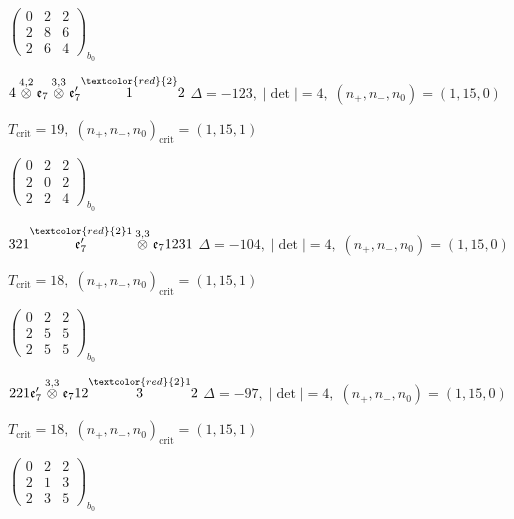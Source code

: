 \documentclass[10pt]{article}
\begin{document}
\hspace{2em}$\left(\begin{smallmatrix}0 & 2 & 2 \\ 2 & 8 & 6 \\ 2 & 6 & 4\end{smallmatrix}\right)_{\!b_0}$

\smallskip

$4\overset{4,2}{\otimes}\mathfrak{e}_7\overset{3,3}{\otimes}\mathfrak{e}_7'\overset{\textcolor{red}{2}}{1}2$ \quad $\Delta=-123,\; |\det|=4,\; (n_+,n_-,n_0)=(1,15,0)$

\hspace{1em}$T_{\text{crit}}=19,\; (n_+,n_-,n_0)_{\text{crit}}=(1,15,1)$

\hspace{2em}$\left(\begin{smallmatrix}0 & 2 & 2 \\ 2 & 0 & 2 \\ 2 & 2 & 4\end{smallmatrix}\right)_{\!b_0}$

\smallskip

$321\overset{\textcolor{red}{2}1}{\mathfrak{e}_7'}\overset{3,3}{\otimes}\mathfrak{e}_71231$ \quad $\Delta=-104,\; |\det|=4,\; (n_+,n_-,n_0)=(1,15,0)$

\hspace{1em}$T_{\text{crit}}=18,\; (n_+,n_-,n_0)_{\text{crit}}=(1,15,1)$

\hspace{2em}$\left(\begin{smallmatrix}0 & 2 & 2 \\ 2 & 5 & 5 \\ 2 & 5 & 5\end{smallmatrix}\right)_{\!b_0}$

\smallskip

$221\mathfrak{e}_7'\overset{3,3}{\otimes}\mathfrak{e}_712\overset{\textcolor{red}{2}1}{3}2$ \quad $\Delta=-97,\; |\det|=4,\; (n_+,n_-,n_0)=(1,15,0)$

\hspace{1em}$T_{\text{crit}}=18,\; (n_+,n_-,n_0)_{\text{crit}}=(1,15,1)$

\hspace{2em}$\left(\begin{smallmatrix}0 & 2 & 2 \\ 2 & 1 & 3 \\ 2 & 3 & 5\end{smallmatrix}\right)_{\!b_0}$
\end{document}
